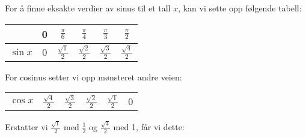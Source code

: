 %




\begin{comment}
	\chapter*{Vedlegg A-H \label{Tips} \addcontentsline{toc}{chapter}{Vedlegg A-H}}
	\vspace{20 pt}
\end{comment}	
\renewcommand{\headwidth}{13cm}	
\eqlen
{}	
For å finne eksakte verdier av sinus til et tall $ x $, kan vi sette opp følgende tabell:\vs \renewcommand{\arraystretch}{1.5}	
\begin{center}
	\begin{tabular}{l|c|c|c|c|c|}
		& 0&$\frac{\pi}{6}$ & $\frac{\pi}{4}$ &$\frac{\pi}{3}$ & $\frac{\pi}{2}$    \\
		\hline
		$\sin x$ & 0 &$\frac{\sqrt{1}}{2}$ & $\frac{\sqrt{2}}{2}$ & $\frac{\sqrt{3}}{2}$ & $ \frac{\sqrt{4}}{2} $ \\
	\end{tabular}
\end{center}
For cosinus setter vi opp mønsteret andre veien:
\begin{center}
	\begin{tabular}{l|c|c|c|c|c}
		$\cos x$ & $\frac{\sqrt{4}}{2}  $ & $\frac{\sqrt{3}}{2}$ & $\frac{\sqrt{2}}{2}$ & $\frac{\sqrt{1}}{2}$ & 0 \\
	\end{tabular}
\end{center}
Erstatter vi $ {\frac{\sqrt{1}}{2}} $ med $ \frac{1}{2} $ og $ \frac{\sqrt{4}}{2} $ med 1, får vi dette:

